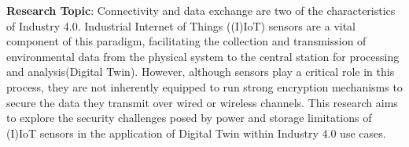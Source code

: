 

\textbf{Research Topic}:
% 
Connectivity and data exchange are two of the characteristics of Industry 4.0. Industrial Internet of Things ((I)IoT) sensors are a vital component of this paradigm, facilitating the collection and transmission of environmental data from the physical system to the central station for processing and analysis(Digital Twin). However, although sensors play a critical role in this process, they are not inherently equipped to run strong encryption mechanisms to secure the data they transmit over wired or wireless channels. This research aims to explore the security challenges posed by power and storage limitations of (I)IoT sensors in the application of Digital Twin within Industry 4.0 use cases. 




